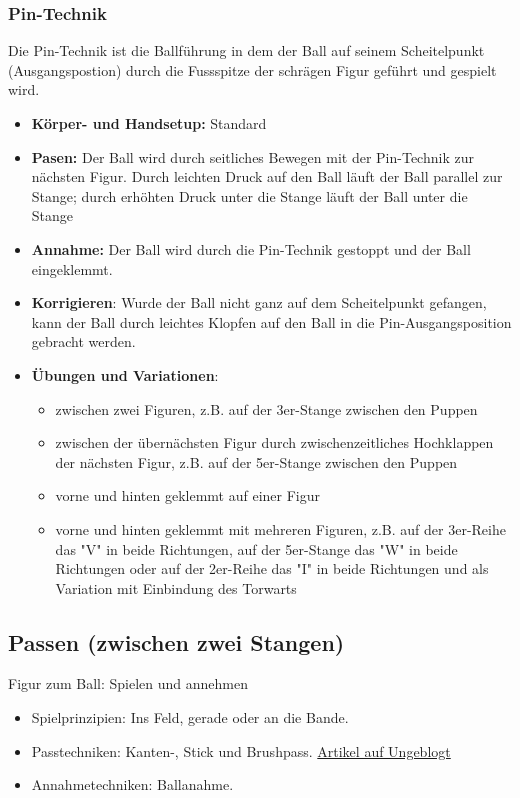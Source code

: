 \subsubsection{Pin-Technik}
Die Pin-Technik ist die Ballführung in dem der Ball auf seinem Scheitelpunkt (Ausgangspostion) durch die Fussspitze der schrägen Figur geführt und gespielt wird.
\begin{itemize}
    \item \textbf{Körper- und Handsetup:} Standard 
    \item \textbf{Pasen:} Der Ball wird durch seitliches Bewegen mit der Pin-Technik zur nächsten Figur. Durch leichten Druck auf den Ball läuft der Ball parallel zur Stange; durch erhöhten Druck unter die Stange läuft der Ball unter die Stange
    \item \textbf{Annahme:} Der Ball wird durch die Pin-Technik gestoppt und der Ball eingeklemmt.
    \item \textbf{Korrigieren}: Wurde der Ball nicht ganz auf dem Scheitelpunkt gefangen, kann der Ball durch leichtes Klopfen auf den Ball in die Pin-Ausgangsposition gebracht werden.
    \item \textbf{Übungen und Variationen}:
        \begin{itemize}
            \item zwischen zwei Figuren, z.B. auf der 3er-Stange zwischen den Puppen
            \item zwischen der übernächsten Figur durch zwischenzeitliches Hochklappen der nächsten Figur, z.B. auf der 5er-Stange zwischen den Puppen
            \item vorne und hinten geklemmt auf einer Figur
            \item vorne und hinten geklemmt mit mehreren Figuren, z.B. auf der 3er-Reihe das "V" in beide Richtungen, auf der 5er-Stange das "W" in beide Richtungen oder auf der 2er-Reihe das "I" in beide Richtungen und als Variation mit Einbindung des Torwarts
        \end{itemize}
\end{itemize}

\subsection{Passen (zwischen zwei Stangen)}
\label{technik:offensive:zwei}

Figur zum Ball: Spielen und annehmen

\begin{itemize}
\item Spielprinzipien: Ins Feld, gerade oder an die Bande.
\item Passtechniken: Kanten-, Stick und Brushpass. 
\href{http://ungeblogtkickern.blogspot.de/2015/09/schrag-schieen.html}{Artikel auf Ungeblogt}
\item Annahmetechniken: Ballanahme.
\end{itemize}

